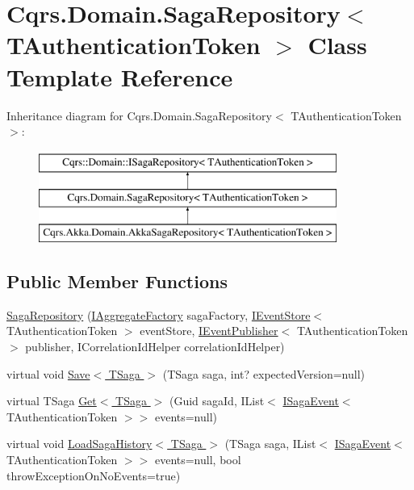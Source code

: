\hypertarget{classCqrs_1_1Domain_1_1SagaRepository}{}\section{Cqrs.\+Domain.\+Saga\+Repository$<$ T\+Authentication\+Token $>$ Class Template Reference}
\label{classCqrs_1_1Domain_1_1SagaRepository}
Inheritance diagram for Cqrs.\+Domain.\+Saga\+Repository$<$ T\+Authentication\+Token $>$\+:\begin{figure}[H]
\begin{center}
\leavevmode
\includegraphics[height=3.000000cm]{classCqrs_1_1Domain_1_1SagaRepository}
\end{center}
\end{figure}
\subsection*{Public Member Functions}
\begin{DoxyCompactItemize}
\item 
\hyperlink{classCqrs_1_1Domain_1_1SagaRepository_a2981231b25fa89133ab50796cd352fbf_a2981231b25fa89133ab50796cd352fbf}{Saga\+Repository} (\hyperlink{interfaceCqrs_1_1Domain_1_1Factories_1_1IAggregateFactory}{I\+Aggregate\+Factory} saga\+Factory, \hyperlink{interfaceCqrs_1_1Events_1_1IEventStore}{I\+Event\+Store}$<$ T\+Authentication\+Token $>$ event\+Store, \hyperlink{interfaceCqrs_1_1Events_1_1IEventPublisher}{I\+Event\+Publisher}$<$ T\+Authentication\+Token $>$ publisher, I\+Correlation\+Id\+Helper correlation\+Id\+Helper)
\item 
virtual void \hyperlink{classCqrs_1_1Domain_1_1SagaRepository_a84cae424cb01de22864ae7d960007cd0_a84cae424cb01de22864ae7d960007cd0}{Save$<$ T\+Saga $>$} (T\+Saga saga, int? expected\+Version=null)
\item 
virtual T\+Saga \hyperlink{classCqrs_1_1Domain_1_1SagaRepository_a1b80ecc2a5719d1681ca5d182a252120_a1b80ecc2a5719d1681ca5d182a252120}{Get$<$ T\+Saga $>$} (Guid saga\+Id, I\+List$<$ \hyperlink{interfaceCqrs_1_1Events_1_1ISagaEvent}{I\+Saga\+Event}$<$ T\+Authentication\+Token $>$$>$ events=null)
\item 
virtual void \hyperlink{classCqrs_1_1Domain_1_1SagaRepository_af6af9066681e47bc4ff2e14358321fb8_af6af9066681e47bc4ff2e14358321fb8}{Load\+Saga\+History$<$ T\+Saga $>$} (T\+Saga saga, I\+List$<$ \hyperlink{interfaceCqrs_1_1Events_1_1ISagaEvent}{I\+Saga\+Event}$<$ T\+Authentication\+Token $>$$>$ events=null, bool throw\+Exception\+On\+No\+Events=true)
\end{DoxyCompactItemize}

